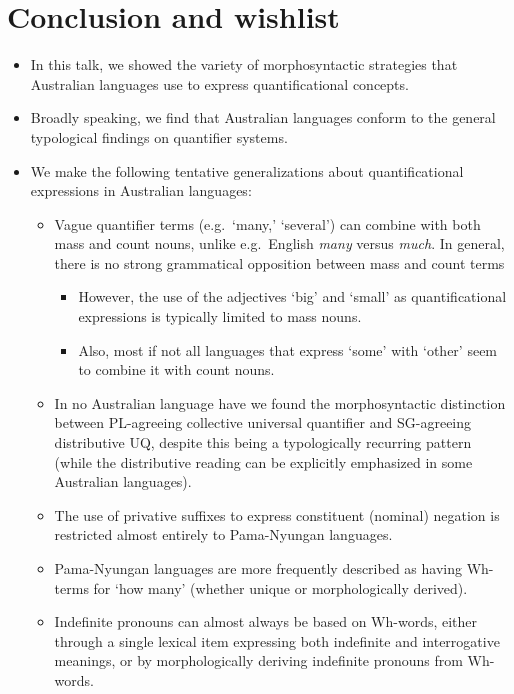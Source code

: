 \documentclass{article}
\begin{document}
\section{Conclusion and wishlist}
\begin{itemize}
\item In this talk, we showed the variety of morphosyntactic strategies that Australian languages use to express quantificational concepts.
\item Broadly speaking, we find that Australian languages conform to the general typological findings on quantifier systems.
\item We make the following tentative generalizations about quantificational expressions in Australian languages:
  \begin{itemize}
  \item Vague quantifier terms (e.g.\ `many,' `several') can combine with both mass and count nouns, unlike e.g.\ English \textit{many} versus \textit{much}. In general, there is no strong grammatical opposition between mass and count terms
    \begin{itemize}
    \item However, the use of the adjectives `big' and `small' as quantificational expressions is typically limited to mass nouns.
    \item Also, most if not all languages that express `some' with `other' seem to combine it with count nouns. %
    \end{itemize}
  \item In no Australian language have we found the morphosyntactic distinction between PL-agreeing collective universal quantifier and SG-agreeing distributive UQ, despite this being a typologically recurring pattern (while the distributive reading can be explicitly emphasized in some Australian languages). %
  \item The use of privative suffixes to express constituent (nominal) negation is restricted almost entirely to Pama-Nyungan languages.
  \item Pama-Nyungan languages are more frequently described as having Wh-terms for `how many' (whether unique or morphologically derived).
  \item Indefinite pronouns can almost always be based on Wh-words, either through a single lexical item expressing both indefinite and interrogative meanings, or by morphologically deriving indefinite pronouns from Wh-words.
  \end{itemize}

\end{itemize}
\end{document}
